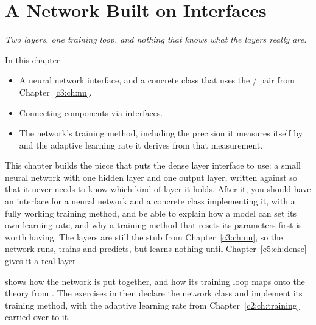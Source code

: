 
\chapter{A Network Built on Interfaces}
\label{c4:ch:network}

{\large\itshape Two layers, one training loop, and nothing that knows what the layers really
are.\par}

\begin{chapterbox}{In this chapter}
\begin{itemize}
  \item A neural network interface, and a concrete  class that uses the
    / pair from Chapter~\ref{c3:ch:nn}.
  \item Connecting components via interfaces.
  \item The network's training method, including the precision it measures itself by and the
    adaptive learning rate it derives from that measurement.
\end{itemize}
\end{chapterbox}

This chapter builds the piece that puts the dense layer interface to use: a small neural network
with one hidden layer and one output layer, written against  so that
it never needs to know which kind of layer it holds. After it, you should have an interface for a
neural network and a concrete class implementing it, with a fully working training method, and be
able to explain how a model can set its own learning rate, and why a training method that resets
its parameters first is worth having. The layers are still the stub from Chapter~\ref{c3:ch:nn}, so
the network runs, trains and predicts, but learns nothing until Chapter~\ref{c5:ch:dense} gives it
a real layer.

 shows how the network is put together, and 
how its training loop maps onto the theory from . The exercises in
 then declare the network class and implement its training method, with
the adaptive learning rate from Chapter~\ref{c2:ch:training} carried over to it.




